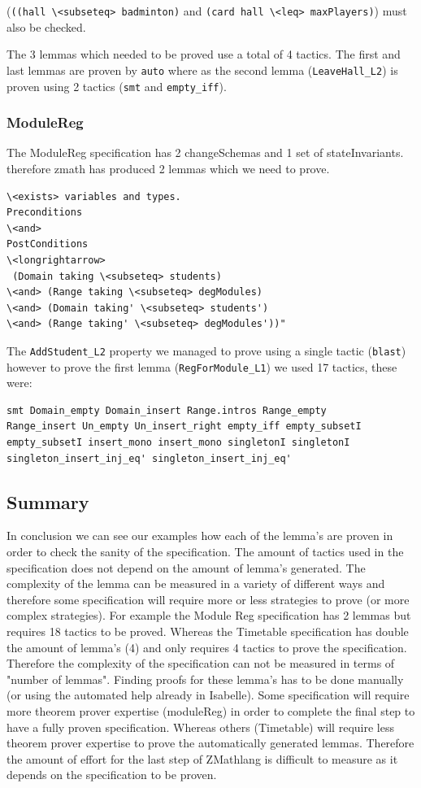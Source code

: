 (\verb|((hall \<subseteq> badminton)| and \verb|(card hall \<leq> maxPlayers)|)
must also be checked.

The 3 lemmas which needed to be proved use a total of 4 tactics. The first and
last lemmas are proven by \verb|auto| where as the second lemma
(\verb|LeaveHall_L2|) is proven using 2 tactics (\verb|smt| and
\verb|empty_iff|).

\subsubsection{ModuleReg}

The ModuleReg specification has 2 changeSchemas and 1 set of stateInvariants.
therefore \gls{zmath} has produced 2 lemmas which we need to prove.

\begin{verbatim}
\<exists> variables and types.
Preconditions
\<and>
PostConditions
\<longrightarrow>
 (Domain taking \<subseteq> students)
\<and> (Range taking \<subseteq> degModules)
\<and> (Domain taking' \<subseteq> students')
\<and> (Range taking' \<subseteq> degModules'))"
\end{verbatim}

The \verb|AddStudent_L2| property we managed to prove using a single tactic
(\verb|blast|) however to prove the first lemma (\verb|RegForModule_L1|) we used
17 tactics, these were:

\begin{verbatim}
smt Domain_empty Domain_insert Range.intros Range_empty 
Range_insert Un_empty Un_insert_right empty_iff empty_subsetI 
empty_subsetI insert_mono insert_mono singletonI singletonI 
singleton_insert_inj_eq' singleton_insert_inj_eq'
\end{verbatim}

\subsection{Summary}
In conclusion we can see our examples how each of the lemma's are proven in
order to check the sanity of the specification. The amount of tactics used in
the specification does not depend on the amount of lemma's generated. The
complexity of the lemma can be measured in a variety of different ways
\cite{complexityofproofs} and therefore some specification will require more or
less strategies to prove (or more complex strategies). For example the Module
Reg specification has 2 lemmas but requires 18 tactics to be proved. Whereas the
Timetable specification has double the amount of lemma's (4) and only requires 4
tactics to prove the specification. Therefore the complexity of the
specification can not be measured in terms of "number of lemmas".
Finding proofs for these lemma's has to be done manually (or using the automated
help already in Isabelle). Some specification will require more theorem prover
expertise (moduleReg) in order to complete the final step to have a fully proven
specification. Whereas others (Timetable) will require less theorem prover
expertise to prove  the automatically generated lemmas. Therefore the amount of effort for
the last step of ZMathlang is difficult to measure as it depends on the
specification to be proven.

